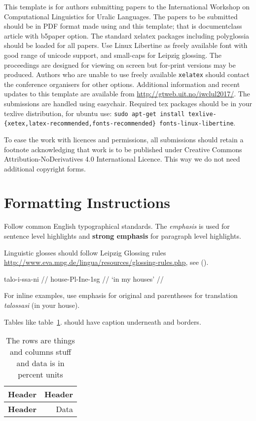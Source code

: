 \documentclass[11pt,a4paper,notitlepage]{article}
\begin{document}
This template is for authors submitting papers to the International Workshop
on Computational Linguistics for Uralic Languages. The papers to be submitted
should be in PDF format made using \XeLaTeX{} and this template; that is
documentclass article with b5paper option. The standard xelatex packages
including polyglossia should be loaded for all papers.  Use Linux Libertine as
freely available font with good range of unicode support, and small-caps for
Leipzig glossing. The proceedings are designed for viewing on screen but
for-print versions may be produced.  Authors who are unable to use freely
available \texttt{xelatex} should contact the conference organisers for other
options. Additional information and recent updates to this template are
available from \url{http://gtweb.uit.no/iwclul2017/}. The submissions are
handled using easychair. Required tex packages should be in your texlive
distribution, for ubuntu use: \texttt{sudo apt-get install
texlive-\{xetex,latex-recommended,fonts-recommended\} fonts-linux-libertine}.

To ease the work with licences and permissions, all submissions should retain
a footnote acknowledging that work is to be published under Creative
Commons Attribution-NoDerivatives 4.0 International Licence. This way we do not
need additional copyright forms.

\section{Formatting Instructions}

Follow common English typographical standards. The \emph{emphasis} is used for
sentence level highlights and \textbf{strong emphasis} for paragraph level
highlights.

Linguistic glosses should follow Leipzig Glossing rules
\url{http://www.eva.mpg.de/lingua/resources/glossing-rules.php}, see (\nextx).

\ex
\begingl
\gla talo-i-ssa-ni //
\glb house-{\sc Pl}-{\sc Ine}-{\sc 1sg} //
\glft `in my houses' //
\endgl
\xe

For inline examples, use emphasis for original and parentheses for translation
\emph{talossasi} (in your house).

Tables like table~\ref{table:example}. should have caption underneath and
borders.

\begin{table}
    \center
    \begin{tabular}{|l|r|}
        \hline
        \bf Header & \bf Header \\
        \hline
        \bf Header & Data \\
        \hline
    \end{tabular}
    \caption{The rows are things and columns stuff and data is in percent units
    \label{table:example}}
\end{table}
\end{document}
